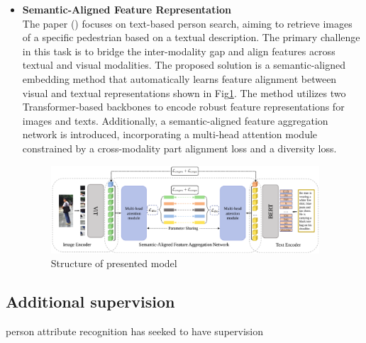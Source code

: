 \begin{itemize}
    \item \textbf{Semantic-Aligned Feature Representation}\\
    The paper (\cite{li2021learning}) focuses on text-based person search, aiming to retrieve images of a specific pedestrian based on a textual description. The primary challenge in this task is to bridge the inter-modality gap and align features across textual and visual modalities. The proposed solution is a semantic-aligned embedding method that automatically learns feature alignment between visual and textual representations shown in Fig\ref{fig:sem_align}. The method utilizes two Transformer-based backbones to encode robust feature representations for images and texts. Additionally, a semantic-aligned feature aggregation network is introduced, incorporating a multi-head attention module constrained by a cross-modality part alignment loss and a diversity loss. 

    \begin{figure}[htbp]
        \begin{center}
            \includegraphics[width=10cm]{img/sem_feature.eps}
            \caption{Structure of presented model}\label{fig:sem_align}
        \end{center}
    \end{figure}
\end{itemize}


\subsection{Additional supervision}
person attribute recognition has seeked to have supervision 


